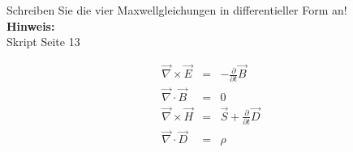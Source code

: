 \begin{question}[section=2,name={Maxwell differenziell},difficulty=,quantity=5,type=thr,tags={20151210,20130314}]
	Schreiben Sie die vier Maxwellgleichungen in differentieller Form an!
	\\ \textbf{Hinweis:}\\
	Skript Seite 13
\end{question}
\begin{solution}
	\begin{eqnarray}
		\vec{\nabla} \times \vec{E} & = & - \frac{\partial}{\partial t} \vec{B}\\
		\vec{\nabla} \cdot \vec{B} & = & 0\\
		\vec{\nabla} \times \vec{H} & = & \vec{S} + \frac{\partial}{\partial t} \vec{D}\\
		\vec{\nabla} \cdot \vec {D} & = & \rho
	\end{eqnarray}
\end{solution}
